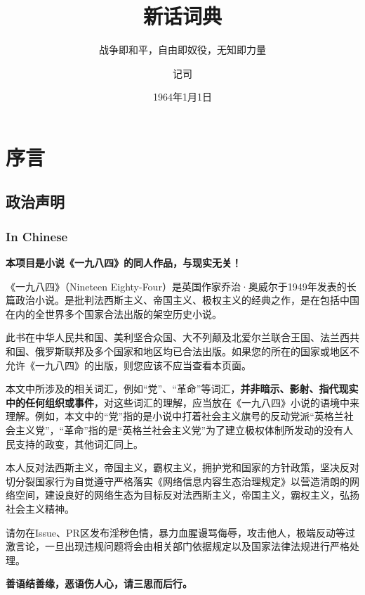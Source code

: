 \documentclass[lang=cn, color=black, chinesefont=founder]{elegantbook}
\title{新话词典}
\subtitle{战争即和平，自由即奴役，无知即力量}
\date{1964年1月1日}
\author{记司}
\institute{真部}
\begin{document}
    \maketitle

    \tableofcontents

    \part*{序言}
        \chapter*{政治声明}
            \section*{In Chinese}
                \textbf{本项目是小说《一九八四》的同人作品，与现实无关！}

                《一九八四》（Nineteen Eighty-Four）是英国作家乔治·奥威尔于1949年发表的长篇政治小说。是批判法西斯主义、帝国主义、极权主义的经典之作，是在包括中国在内的全世界多个国家合法出版的架空历史小说。

                此书在中华人民共和国、美利坚合众国、大不列颠及北爱尔兰联合王国、法兰西共和国、俄罗斯联邦及多个国家和地区均已合法出版。如果您的所在的国家或地区不允许《一九八四》的出版，则您应该不应当查看本页面。

                本文中所涉及的相关词汇，例如“党”、“革命”等词汇，\textbf{并非暗示、影射、指代现实中的任何组织或事件}，对这些词汇的理解，应当放在《一九八四》小说的语境中来理解。例如，本文中的“党”指的是小说中打着社会主义旗号的反动党派“英格兰社会主义党”，“革命”指的是“英格兰社会主义党”为了建立极权体制所发动的没有人民支持的政变，其他词汇同上。

                本人反对法西斯主义，帝国主义，霸权主义，拥护党和国家的方针政策，坚决反对切分裂国家行为自觉遵守严格落实《网络信息内容生态治理规定》以营造清朗的网络空间，建设良好的网络生态为目标反对法西斯主义，帝国主义，霸权主义，弘扬社会主义精神。

                请勿在Issue、PR区发布淫秽色情，暴力血腥谩骂侮辱，攻击他人，极端反动等过激言论，一旦出现违规问题将会由相关部门依据规定以及国家法律法规进行严格处理。
                
                \begin{center}
                    \large
                    \textbf{善语结善缘，恶语伤人心，请三思而后行。}
                \end{center}
            
\end{document}
